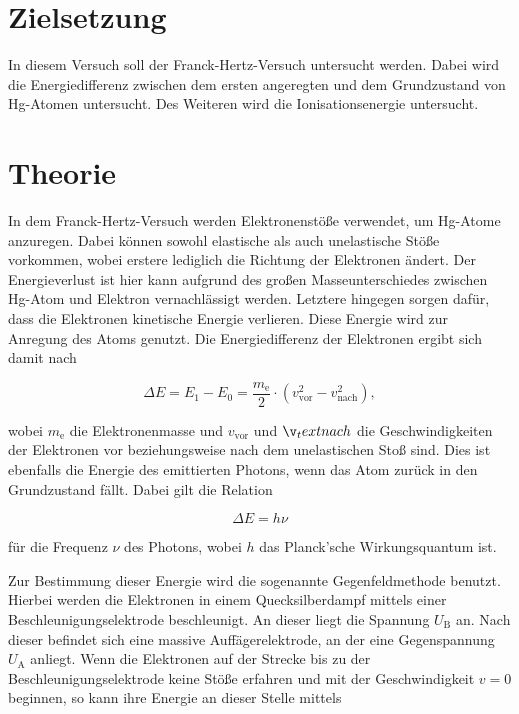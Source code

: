 \section{Zielsetzung}

In diesem Versuch soll der Franck-Hertz-Versuch untersucht werden. Dabei wird die Energiedifferenz zwischen dem ersten angeregten und dem Grundzustand von Hg-Atomen untersucht.
Des Weiteren wird die Ionisationsenergie untersucht.

\section{Theorie}
\label{sec:Theorie}

In dem Franck-Hertz-Versuch werden Elektronenstöße verwendet, um Hg-Atome anzuregen.
Dabei können sowohl elastische als auch unelastische Stöße vorkommen, wobei erstere lediglich die Richtung der Elektronen ändert. Der Energieverlust ist hier kann aufgrund des großen Masseunterschiedes zwischen Hg-Atom und Elektron vernachlässigt werden.
Letztere hingegen sorgen dafür, dass die Elektronen kinetische Energie verlieren. Diese Energie wird zur Anregung des Atoms genutzt.
Die Energiedifferenz der Elektronen ergibt sich damit nach

\begin{equation}
    \label{eqn:e-diff}
    \Delta E = E_1 - E_0 = \frac{m_\text{e}}{2} \cdot (v_\text{vor}^2 - v_\text{nach}^2),
\end{equation}

wobei $m_\text{e}$ die Elektronenmasse und $v_\text{vor}$ und $\v_text{nach}$ die Geschwindigkeiten der Elektronen vor beziehungsweise nach dem unelastischen Stoß sind.
Dies ist ebenfalls die Energie des emittierten Photons, wenn das Atom zurück in den Grundzustand fällt. Dabei gilt die Relation

\begin{equation}
    \label{eqn:photon-energie}
    \Delta E = h \nu
\end{equation}

für die Frequenz $\nu$ des Photons, wobei $h$ das Planck'sche Wirkungsquantum ist.

Zur Bestimmung dieser Energie wird die sogenannte Gegenfeldmethode benutzt.
Hierbei werden die Elektronen in einem Quecksilberdampf mittels einer Beschleunigungselektrode beschleunigt. An dieser liegt die Spannung $U_\text{B}$ an.
Nach dieser befindet sich eine massive Auffägerelektrode, an der eine Gegenspannung $U_\text{A}$ anliegt.
Wenn die Elektronen auf der Strecke bis zu der Beschleunigungselektrode keine Stöße erfahren und mit der Geschwindigkeit $v = 0$ beginnen, so kann ihre Energie an dieser Stelle mittels

